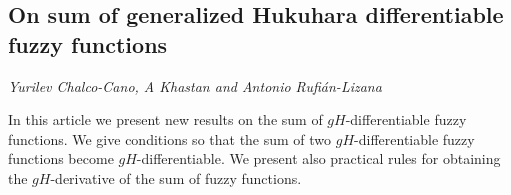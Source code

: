 \documentclass[../booklet.tex]{subfiles}
\begin{document}
\subsection[On sum of generalized Hukuhara differentiable fuzzy functions. {\it Yurilev Chalco-Cano, A Khastan and Antonio Rufián-Lizana}]{On sum of generalized Hukuhara differentiable fuzzy functions}
  

\begin{center}
  {\it Yurilev Chalco-Cano, A Khastan and Antonio Rufián-Lizana}
\end{center}

\vskip 0.8cm


In this article we present new results on the sum of $gH$-differentiable fuzzy functions. We give conditions so that the sum of two $gH$-differentiable fuzzy functions become $gH$-differentiable. We present also practical rules for obtaining the $gH$-derivative of the sum of fuzzy functions. 

\end{document}
